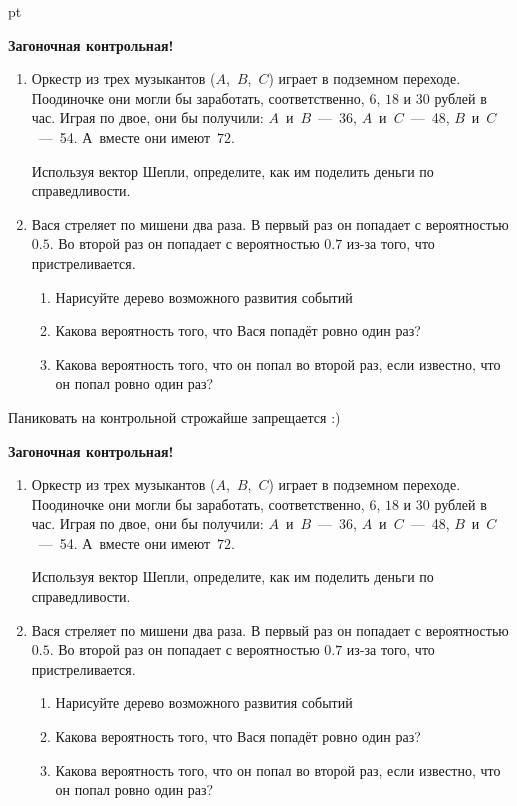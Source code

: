 \documentclass[pdftex,12pt,a4paper]{article}
\begin{document}
 pt %

\textbf{Загоночная контрольная!}


\begin{enumerate}


\item Оркестр из трех музыкантов ($A$,~$B$,~$C$) играет в подземном переходе. Поодиночке они
могли бы заработать, соответственно, $6$, $18$ и $30$
рублей в час. Играя по двое, они бы получили: $A$~и~$B$~---~36, $A$~и~$C$~---~48, $B$~и~$C$~---~54.
А~вместе они имеют~$72$.


Используя вектор Шепли, определите, как им поделить деньги по справедливости.

\item Вася стреляет по мишени два раза. В первый раз он попадает с вероятностью $0.5$. Во второй раз он попадает с вероятностью $0.7$ из-за того, что пристреливается. 
\begin{enumerate}
\item Нарисуйте дерево возможного развития событий
\item Какова вероятность того, что Вася попадёт ровно один раз?
\item Какова вероятность того, что он попал во второй раз, если известно, что он попал ровно один раз?
\end{enumerate}

\end{enumerate}

Паниковать на контрольной строжайше запрещается :)

\vspace{40pt}

\textbf{Загоночная контрольная!}

\begin{enumerate}


\item Оркестр из трех музыкантов ($A$,~$B$,~$C$) играет в подземном переходе. Поодиночке они
могли бы заработать, соответственно, $6$, $18$ и $30$
рублей в час. Играя по двое, они бы получили: $A$~и~$B$~---~36, $A$~и~$C$~---~48, $B$~и~$C$~---~54.
А~вместе они имеют~$72$.


Используя вектор Шепли, определите, как им поделить деньги по справедливости.

\item Вася стреляет по мишени два раза. В первый раз он попадает с вероятностью $0.5$. Во второй раз он попадает с вероятностью $0.7$ из-за того, что пристреливается. 
\begin{enumerate}
\item Нарисуйте дерево возможного развития событий
\item Какова вероятность того, что Вася попадёт ровно один раз?
\item Какова вероятность того, что он попал во второй раз, если известно, что он попал ровно один раз?
\end{enumerate}

\end{enumerate}
\end{document}
